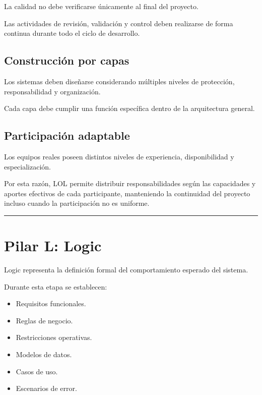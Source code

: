 \documentclass[14pt,a4paper,oneside]{extbook}
\begin{document}
La calidad no debe verificarse únicamente al final del proyecto.

Las actividades de revisión, validación y control deben realizarse de forma continua durante todo el ciclo de desarrollo.

\subsection{Construcción por capas}

Los sistemas deben diseñarse considerando múltiples niveles de protección, responsabilidad y organización.

Cada capa debe cumplir una función específica dentro de la arquitectura general.

\subsection{Participación adaptable}

Los equipos reales poseen distintos niveles de experiencia, disponibilidad y especialización.

Por esta razón, LOL permite distribuir responsabilidades según las capacidades y aportes efectivos de cada participante, manteniendo la continuidad del proyecto incluso cuando la participación no es uniforme.

\par\vspace{1.5em}\noindent\hfill\rule{0.25\textwidth}{0.6pt}\hfill\par\vspace{1.5em}

\section{Pilar L: Logic}

Logic representa la definición formal del comportamiento esperado del sistema.

Durante esta etapa se establecen:

\begin{itemize}
\item Requisitos funcionales.
\item Reglas de negocio.
\item Restricciones operativas.
\item Modelos de datos.
\item Casos de uso.
\item Escenarios de error.
\end{itemize}
\end{document}
